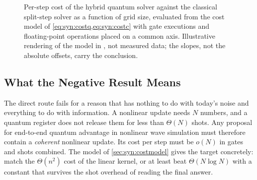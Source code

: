 \begin{figure}[htbp]
\centering
{}
\caption{Per-step cost of the hybrid quantum solver against the classical split-step solver as a function of grid size, evaluated from the cost model of \cref{eq:syn:costq,eq:syn:costc} with gate executions and floating-point operations placed on a common axis. Illustrative rendering of the model in \cite{guo2026nonlinearwaves}, not measured data; the slopes, not the absolute offsets, carry the conclusion.}
\label{fig:syn:cost}
\end{figure}

\subsection{What the Negative Result Means}\label{sec:syn:waves-meaning}

The direct route fails for a reason that has nothing to do with today's noise and everything to do with information. A nonlinear update needs $N$ numbers, and a quantum register does not release them for less than $\Theta(N)$ shots. Any proposal for end-to-end quantum advantage in nonlinear wave simulation must therefore contain a \emph{coherent} nonlinear update. Its cost per step must be $o(N)$ in gates and shots combined. The model of \cref{sec:syn:costmodel} gives the target concretely: match the $\Theta(n^{2})$ cost of the linear kernel, or at least beat $\Theta(N\log N)$ with a constant that survives the shot overhead of reading the final answer.

